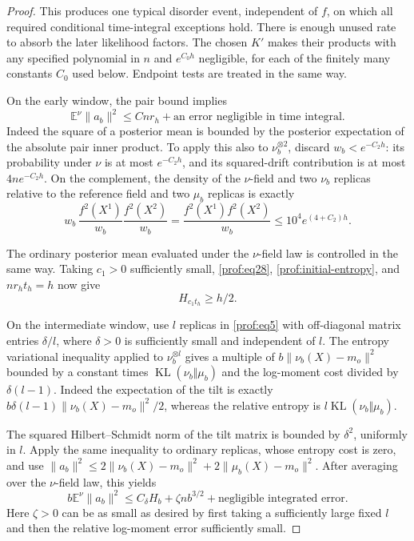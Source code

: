 \begin{proof}
This produces one typical disorder event, independent of
$f$, on which all required conditional time-integral exceptions hold.
There is enough unused rate to absorb the later likelihood factors.
The chosen $K'$ makes their products with any specified polynomial in $n$
and $e^{C_0h}$ negligible, for each of the finitely many constants $C_0$
used below. Endpoint tests are treated in the same way.

On the early window, the pair bound implies
\begin{equation}
 \mathbb E^\nu\|a_b\|^2\le Cnr_h
                  +\text{an error negligible in time integral}.
 \label{prof:early-drift}
\end{equation}
Indeed the square of a posterior mean is bounded by the posterior
expectation of the absolute pair inner product.  To apply this also to
$\nu_b^{\otimes2}$, discard $w_b<e^{-C_2h}$: its probability under $\nu$
is at most $e^{-C_2h}$, and its squared-drift contribution is at
most \(4ne^{-C_2h}\). On the complement, the density of the
\(\nu\)-field and two \(\nu_b\) replicas relative to the
reference field and two \(\mu_b\) replicas is exactly
\[
 w_b\,\frac{f^2(X^1)}{w_b}\frac{f^2(X^2)}{w_b}
 =\frac{f^2(X^1)f^2(X^2)}{w_b}
 \le10^4e^{(4+C_2)h}.
\]

The ordinary posterior mean evaluated under the
$\nu$-field law is controlled in the same way.  Taking $c_1>0$ sufficiently
small, \eqref{prof:eq28}, \eqref{prof:initial-entropy}, and
$nr_ht_h=h$ now give
\begin{equation}
 H_{c_1t_h}\ge h/2.
 \label{prof:early-entropy}
\end{equation}

On the intermediate window, use $l$ replicas in \eqref{prof:eq5} with
off-diagonal matrix entries $\delta/l$, where $\delta>0$ is sufficiently
small and independent of $l$.  The entropy variational inequality applied
to $\nu_b^{\otimes l}$ gives a multiple of
$b\|\nu_b(X)-m_o\|^2$ bounded by a constant times
$\operatorname{KL}(\nu_b\Vert\mu_b)$ and the log-moment cost divided by
$\delta(l-1)$.  Indeed the expectation of the tilt is exactly
$b\delta(l-1)\|\nu_b(X)-m_o\|^2/2$, whereas the relative entropy is
$l\operatorname{KL}(\nu_b\Vert\mu_b)$.

The squared Hilbert--Schmidt norm
of the tilt matrix is bounded by $\delta^2$, uniformly in $l$.  Apply the
same inequality to ordinary replicas, whose entropy cost is zero, and use
$\|a_b\|^2\le2\|\nu_b(X)-m_o\|^2+2\|\mu_b(X)-m_o\|^2$.
After averaging over the $\nu$-field law, this yields
\begin{equation}
 b\mathbb E^\nu\|a_b\|^2
       \le C_\delta H_b+\zeta nb^{3/2}
                  +\text{negligible integrated error}.
 \label{prof:intermediate-drift}
\end{equation}
Here $\zeta>0$ can be as small as desired by first taking a sufficiently
large fixed $l$ and then the relative log-moment error sufficiently small.


\end{proof}
